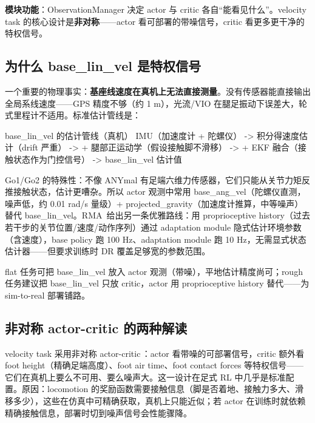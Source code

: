 \textbf{模块功能}：ObservationManager 决定 actor 与 critic 各自“能看见什么”。velocity task 的核心设计是\textbf{非对称}——actor 看可部署的带噪信号，critic 看更多更干净的特权信号。

\subsection{为什么 base\_lin\_vel 是特权信号}
\label{sec:rlmc-ql-obs-priv}

一个重要的物理事实：\textbf{基座线速度在真机上无法直接测量}。没有传感器能直接输出全局系线速度——GPS 精度不够（约 1 m），光流/VIO 在腿足振动下误差大，轮式里程计不适用。标准估计管线是：

\begin{codebox}{base\_lin\_vel 的估计管线（真机）}
IMU（加速度计 + 陀螺仪）
  -> 积分得速度估计（drift 严重）
  -> + 腿部正运动学（假设接触脚不滑移）
  -> + EKF 融合（接触状态作为门控信号）
  -> base_lin_vel 估计值
\end{codebox}

Go1/Go2 的特殊性：不像 ANYmal 有足端六维力传感器，它们只能从关节力矩反推接触状态，估计更嘈杂。所以 actor 观测中常用 base\_ang\_vel（陀螺仪直测，噪声低，约 0.01 rad/s 量级）+ projected\_gravity（加速度计推算，中等噪声）替代 base\_lin\_vel。RMA\,\cite{kumar2021rma} 给出另一条优雅路线：用 proprioceptive history（过去若干步的关节位置/速度/动作序列）通过 adaptation module 隐式估计环境参数（含速度），base policy 跑 100 Hz、adaptation module 跑 10 Hz，无需显式状态估计器——但要求训练时 DR 覆盖足够宽的参数范围。

\begin{note}
flat 任务可把 base\_lin\_vel 放入 actor 观测（带噪），平地估计精度尚可；rough 任务建议把 base\_lin\_vel 只放 critic，actor 用 proprioceptive history 替代——为 sim-to-real 部署铺路。
\end{note}

\subsection{非对称 actor-critic 的两种解读}
\label{sec:rlmc-ql-obs-asym}

velocity task 采用非对称 actor-critic\,\cite{pinto2018asymmetric}：actor 看带噪的可部署信号，critic 额外看 foot height（精确足端高度）、foot air time、foot contact forces 等特权信号——它们在真机上要么不可用、要么噪声大。这一设计在足式 RL 中几乎是标准配置。原因：locomotion 的奖励函数需要接触信息（脚是否着地、接触力多大、滑移多少），这些在仿真中可精确获取，真机上只能近似；若 actor 在训练时就依赖精确接触信息，部署时切到噪声信号会性能骤降。


